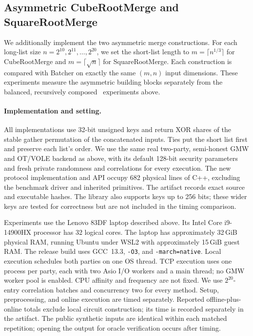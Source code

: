 \subsection{Asymmetric CubeRootMerge and SquareRootMerge}
\label{sec:root-merge-evaluation}

We additionally implement the two asymmetric merge constructions.
For each long-list size $n=2^{10},2^{11},\ldots,2^{20}$, we set the short-list
length to $m=\lceil n^{1/3}\rceil$ for CubeRootMerge and
$m=\lceil\sqrt n\rceil$ for SquareRootMerge.
Each construction is compared with Batcher on exactly the same $(m,n)$ input
dimensions. These experiments measure the asymmetric building blocks separately
from the balanced, recursively composed \ourprotocol\ experiments above.

\paragraph{Implementation and setting.}
All implementations use 32-bit unsigned keys and return XOR shares of the
stable gather permutation of the concatenated inputs. Ties put the short list
first and preserve each list's order. We use the same real two-party,
semi-honest GMW and OT/VOLE backend as above, with its default 128-bit security
parameters and fresh private randomness
and correlations for every execution. The new protocol implementation and API
occupy 682 physical lines of C++, excluding the benchmark driver
and inherited primitives. The artifact records exact source and executable hashes.
The library also supports keys up to 256 bits; these wider keys are tested for
correctness but are not included in the timing comparison.

Experiments use the Lenovo 83DF laptop described above. Its Intel Core
i9-14900HX processor has 32 logical cores. The laptop has approximately
32\,GiB physical RAM, running
Ubuntu under WSL2 with approximately 15\,GiB guest RAM.
The release build uses GCC~13.3, \texttt{-O3}, and \texttt{-march=native}.
Local execution schedules both parties on one OS thread. TCP execution uses
one process per party, each with two Asio I/O workers and a main thread;
no GMW worker pool is enabled. CPU affinity and frequency are not fixed.
We use $2^{20}$-entry correlation batches and concurrency two for every method.
Setup, preprocessing, and online execution are timed separately.
Reported offline-plus-online totals exclude local circuit construction;
its time is recorded separately in the artifact.
The public synthetic inputs are identical within each matched repetition;
opening the output for oracle verification occurs after timing.

